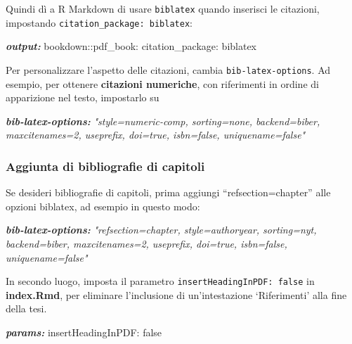 \documentclass[a4paper, 11pt, nobind]{templates/ociamthesis}
\newenvironment{Shaded}{\begin{snugshade}}{\end{snugshade}}
\newcommand{\AnnotationTok}[1]{\textcolor[rgb]{0.56,0.35,0.01}{\textbf{\textit{#1}}}}
\newcommand{\CommentTok}[1]{\textcolor[rgb]{0.56,0.35,0.01}{\textit{#1}}}
\newcommand{\NormalTok}[1]{#1}
\renewenvironment{Shaded}
{
  \vspace{10pt}%
  \begin{snugshade}%
}{%
  \end{snugshade}%
  \vspace{8pt}%
}
\begin{document}
Quindi dì a R Markdown di usare \texttt{biblatex} quando inserisci le citazioni, impostando \texttt{citation\_package:\ biblatex}:

\begin{Shaded}
\begin{Highlighting}[]
\AnnotationTok{output:}
\NormalTok{  bookdown::pdf\_book:}
\NormalTok{    citation\_package: biblatex}
\end{Highlighting}
\end{Shaded}

Per personalizzare l'aspetto delle citazioni, cambia \texttt{bib-latex-options}. Ad esempio, per ottenere \textbf{citazioni numeriche}, con riferimenti in ordine di apparizione nel testo, impostarlo su

\begin{Shaded}
\begin{Highlighting}[]
\AnnotationTok{bib{-}latex{-}options:}\CommentTok{ "style=numeric{-}comp, sorting=none, backend=biber, maxcitenames=2, useprefix, doi=true, isbn=false, uniquename=false"}
\end{Highlighting}
\end{Shaded}

\hypertarget{aggiunta-di-bibliografie-di-capitoli}{%
\subsubsection{Aggiunta di bibliografie di capitoli}\label{aggiunta-di-bibliografie-di-capitoli}}

Se desideri bibliografie di capitoli, prima aggiungi ``refsection=chapter'' alle opzioni biblatex, ad esempio in questo modo:

\begin{Shaded}
\begin{Highlighting}[]
\AnnotationTok{bib{-}latex{-}options:}\CommentTok{ "refsection=chapter, style=authoryear, sorting=nyt, backend=biber, maxcitenames=2, useprefix, doi=true, isbn=false, uniquename=false"}
\end{Highlighting}
\end{Shaded}

In secondo luogo, imposta il parametro \texttt{insertHeadingInPDF:\ false} in \textbf{index.Rmd}, per eliminare l'inclusione di un'intestazione `Riferimenti' alla fine della tesi.

\begin{Shaded}
\begin{Highlighting}[]
\AnnotationTok{params:}
\NormalTok{  insertHeadingInPDF: false}
\end{Highlighting}
\end{Shaded}
\end{document}
